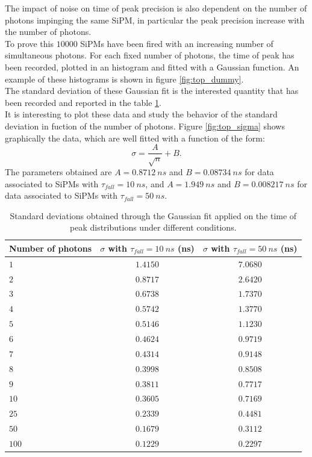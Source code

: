 The impact of noise on time of peak precision is also dependent on the number of photons impinging the same SiPM, in particular the peak precision increase with the number of photons.\\
To prove this $10000$ SiPMs have been fired with an increasing number of simultaneous photons. For each fixed number of photons, the time of peak has been recorded, plotted in an histogram and fitted with a Gaussian function. An example of these histograms is shown in figure \ref{fig:top_dummy}.\\

The standard deviation of these Gaussian fit is the interested quantity that has been recorded and reported in the table \ref{tab:sigmas}.\\
It is interesting to plot these data and study the behavior of the standard deviation in fuction of the number of photons. Figure \ref{fig:top_sigma} shows graphically the data, which are well fitted with a function of the form:
\begin{equation}
	\sigma = \frac{A}{\sqrt{n}} + B.
\end{equation}
The parameters obtained are $A = 0.8712\ ns$ and $B = 0.08734\ ns$ for data associated to SiPMs with $\tau_{fall}=10\ ns$, and $A = 1.949\ ns$ and $B = 0.008217\ ns$ for data associated to SiPMs with $\tau_{fall}=50\ ns$.

\begin{table}
	\centering
	\begin{tabular}{lcc}
		\toprule
		Number of photons	& $\sigma$ with $\tau_{fall}=10\ ns$ (ns) & $\sigma$ with $\tau_{fall}=50\ ns$ (ns)	\\
		\midrule
		$1$ 	& $1.4150$ & $7.0680$ \\
		$2$ 	& $0.8717$ & $2.6420$ \\
		$3$ 	& $0.6738$ & $1.7370$ \\
		$4$ 	& $0.5742$ & $1.3770$ \\
		$5$ 	& $0.5146$ & $1.1230$ \\
		$6$ 	& $0.4624$ & $0.9719$ \\
		$7$ 	& $0.4314$ & $0.9148$ \\
		$8$ 	& $0.3998$ & $0.8508$ \\
		$9$ 	& $0.3811$ & $0.7717$ \\
		$10$ 	& $0.3605$ & $0.7169$ \\
		$25$ 	& $0.2339$ & $0.4481$ \\
		$50$ 	& $0.1679$ & $0.3112$ \\
		$100$ 	& $0.1229$ & $0.2297$ \\
		\bottomrule
	\end{tabular}
	\caption{Standard deviations obtained through the Gaussian fit applied on the time of peak distributions under different conditions. }
	\label{tab:sigmas}
\end{table}

